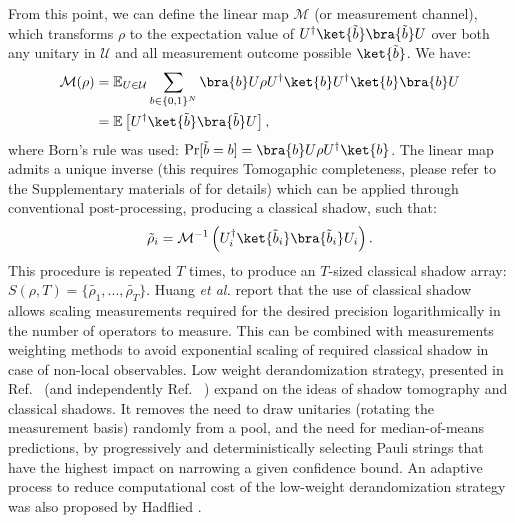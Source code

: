 From this point, we can define the linear map $\mathcal{M}$ (or measurement channel), which transforms $\rho$ to the expectation value of $U^{\dagger}\ket{\tilde{b}}\bra{\tilde{b}}U$ over both any unitary in $\mathcal{U}$ and all measurement outcome possible $\ket{\tilde{b}}$. We have: 
\begin{align}
    \mathcal{M}(\rho) &= \mathbb{E}_{U\in\mathcal{U}} \sum_{b \in \{0, 1 \}^N} \bra{b}U\rho U^{\dagger}\ket{b} U^{\dagger}\ket{b}\bra{b} U \nonumber \\
    & = \mathbb{E}\left[U^{\dagger}\ket{\tilde{b}}\bra{\tilde{b}}U  \right],
\end{align}
where Born's rule was used: $\mathrm{Pr}[\tilde{b} = b] = \bra{b} U \rho U^{\dagger} \ket{b}$. The linear map admits a unique inverse (this requires Tomogaphic completeness, please refer to the Supplementary materials of \cite{Huang2020} for details) which can be applied through conventional post-processing, producing a classical shadow, such that:
\begin{equation}
    \tilde{\rho}_i = \mathcal{M}^{-1} \left( U_i^{\dagger}\ket{\tilde{b}_i}\bra{\tilde{b}_i}U_i \right).
\end{equation}
This procedure is repeated $T$ times, to produce an $T$-sized classical shadow array: $S(\rho, T) = \{ \tilde{\rho_1}, ..., \tilde{\rho_T} \}$. Huang \textit{et al.} \cite{Huang2020} report that the use of classical shadow allows scaling measurements required for the desired precision logarithmically in the number of operators to measure. This can be combined with measurements weighting methods \cite{Hadfield2020} to avoid exponential scaling of required classical shadow in case of non-local observables. Low weight derandomization strategy, presented in Ref.~\cite{Huang2021} (and independently Ref.~ \cite{acharya2021informationally}) expand on the ideas of shadow tomography and classical shadows. It removes the need to draw unitaries (rotating the measurement basis) randomly from a pool, and the need for median-of-means predictions, by progressively and deterministically selecting Pauli strings that have the highest impact on narrowing a given confidence bound. An adaptive process to reduce computational cost of the low-weight derandomization strategy was also proposed by Hadflied \cite{Hadfield2021}.

